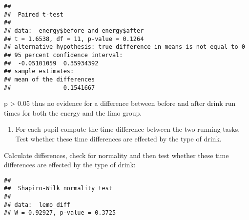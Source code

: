 \documentclass[
]{article}
\newenvironment{Shaded}{\begin{snugshade}}{\end{snugshade}}
\newcommand{\AttributeTok}[1]{\textcolor[rgb]{0.77,0.63,0.00}{#1}}
\newcommand{\CommentTok}[1]{\textcolor[rgb]{0.56,0.35,0.01}{\textit{#1}}}
\newcommand{\ConstantTok}[1]{\textcolor[rgb]{0.00,0.00,0.00}{#1}}
\newcommand{\FunctionTok}[1]{\textcolor[rgb]{0.00,0.00,0.00}{#1}}
\newcommand{\NormalTok}[1]{#1}
\newcommand{\OtherTok}[1]{\textcolor[rgb]{0.56,0.35,0.01}{#1}}
\newcommand{\SpecialCharTok}[1]{\textcolor[rgb]{0.00,0.00,0.00}{#1}}
\providecommand{\tightlist}{%
  \setlength{\itemsep}{0pt}\setlength{\parskip}{0pt}}
\begin{document}
\begin{Shaded}
\end{Shaded}

\begin{verbatim}
## 
##  Paired t-test
## 
## data:  energy$before and energy$after
## t = 1.6538, df = 11, p-value = 0.1264
## alternative hypothesis: true difference in means is not equal to 0
## 95 percent confidence interval:
##  -0.05101059  0.35934392
## sample estimates:
## mean of the differences 
##               0.1541667
\end{verbatim}

p \textgreater{} 0.05 thus no evidence for a difference between before
and after drink run times for both the energy and the limo group.

\begin{enumerate}
\def\labelenumi{\alph{enumi})}
\setcounter{enumi}{2}
\tightlist
\item
  For each pupil compute the time difference between the two running
  tasks. Test whether these time differences are effected by the type of
  drink.
\end{enumerate}

Calculate differences, check for normality and then test whether these
time differences are effected by the type of drink:

\begin{Shaded}
\end{Shaded}

\begin{verbatim}
## 
##  Shapiro-Wilk normality test
## 
## data:  lemo_diff
## W = 0.92927, p-value = 0.3725
\end{verbatim}
\end{document}
